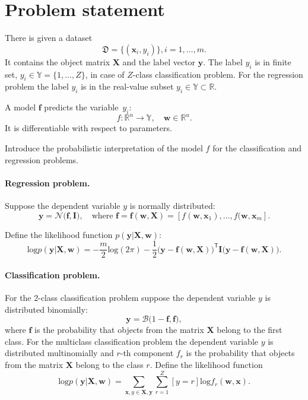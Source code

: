 \documentclass[smallcondensed]{svjour3}
\begin{document}
\section{Problem statement}
\label{prob_stat}
There is given a dataset \begin{equation}\label{eq:dataset}\mathfrak{D} = \{(\mathbf{x}_i,y_i)\}, i = 1,\dots,m.\end{equation} It contains the object matrix $\mathbf{X}$ and the label vector  $\mathbf{y}$. The label  ${y_i}$ is in finite set, ${y}_i \in \mathbb{Y} = \{1, \dots, Z\}$, in case of $Z$-class classification problem. For the regression problem the label $y_i$ is in the real-value subset ${y_i} \in \mathbb{Y} \subset  \mathbb{R}$.

A model $\mathbf{f}$ predicts the variable~$y_i$:
\[
	f:\mathbb{R}^n \to \mathbb{Y}, \quad \mathbf{w} \in \mathbb{R}^u.
\]
It is differentiable with respect to parameters.

Introduce the probabilistic interpretation of the model $f$ for the classification and regression problems.

\paragraph{Regression problem.}
Suppose the dependent variable $y$ is normally distributed:
\begin{equation}
\label{eq:reg}
\mathbf{y} = \mathcal{N}\bigl(\mathbf{f}, \mathbf{I}\bigr),\quad \text{where }\mathbf{f} = \mathbf{f}(\mathbf{w}, \mathbf{X}) = [f(\mathbf{w}, \mathbf{x}_1),\dots,f(\mathbf{w}, \mathbf{x}_m].
\end{equation}


Define the likelihood function $p(\mathbf{y}|\mathbf{X}, \mathbf{w})$:
\[
	\text{log}p(\mathbf{y}|\mathbf{X}, \mathbf{w}) =-\frac{m}{2}\text{log}(2\pi)   -\frac{1}{2}\bigl(\mathbf{y} - \mathbf{f}(\mathbf{w}, \mathbf{X}))^\mathsf{T}\mathbf{I}(\mathbf{y} - \mathbf{f}(\mathbf{w}, \mathbf{X})\bigr).
\] 

\paragraph{Classification problem.}
For the 2-class classification problem suppose the dependent variable $y$  is distributed binomially:
\begin{equation}
\label{eq:cl}
	\mathbf{y} = \mathcal{B}\bigl(1-\mathbf{f}, \mathbf{f}\bigr),
\end{equation}
where  $\mathbf{f}$ is the probability that objects from the matrix $\mathbf{X}$  belong to the first class.
For the multiclass classification problem the  dependent variable $y$  is distributed multinomially and $r$-th component ${f}_r$ is the probability that objects from the matrix $\mathbf{X}$  belong to the class $r$. Define the likelihood function
\[
	\text{log}p(\mathbf{y}|\mathbf{X}, \mathbf{w}) = \sum_{\mathbf{x}, y \in \mathbf{X}, \mathbf{y}} \sum_{r=1}^Z[y=r] \text{log}{f}_r(\mathbf{w}, \mathbf{x}).
\] 
\end{document}
